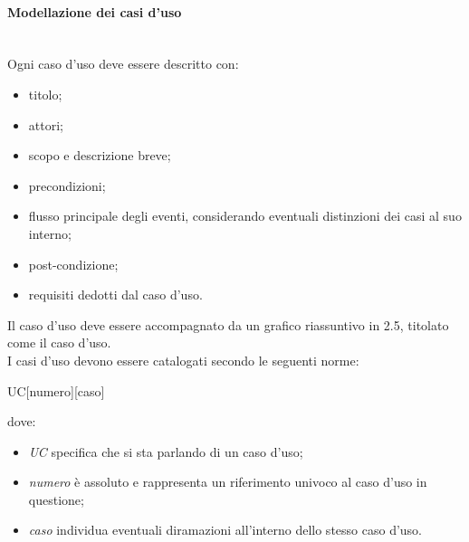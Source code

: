 \paragraph{Modellazione dei casi d'uso}\mbox{}\label{modellazione-casi-uso}\\
Ogni caso d'uso deve essere descritto con:
\begin{itemize}
	\item titolo;
	\item attori;
	\item scopo e descrizione breve;
	\item precondizioni;
	\item flusso principale degli eventi, considerando eventuali distinzioni dei casi al suo interno;
	\item post-condizione;
	\item requisiti dedotti dal caso d'uso.
\end{itemize}
Il caso d'uso deve essere accompagnato da un grafico riassuntivo in  2.5, titolato come il caso d'uso.\\
I casi d'uso devono essere catalogati secondo le seguenti norme:
\begin{center}
	UC[numero][caso]
\end{center}
dove:
\begin{itemize}
	\item \textit{UC} specifica che si sta parlando di un caso d'uso;
	\item \textit{numero} è assoluto e rappresenta un riferimento univoco al caso d'uso in questione;
	\item \textit{caso} individua eventuali diramazioni all'interno dello stesso caso d’uso.
\end{itemize}

